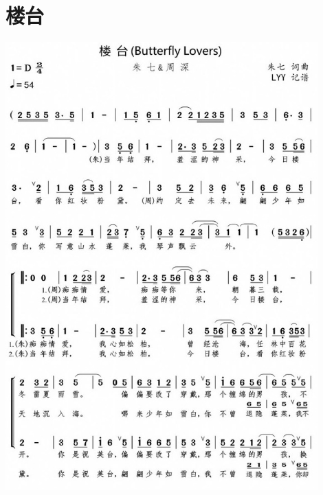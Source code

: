 \documentclass[cn,pad,twocol]{elegantbook}
\begin{document}
\section{楼台}
    \includegraphics[width=0.9\textwidth]{dongxiao/20200901-楼台.jpeg}
\end{document}
